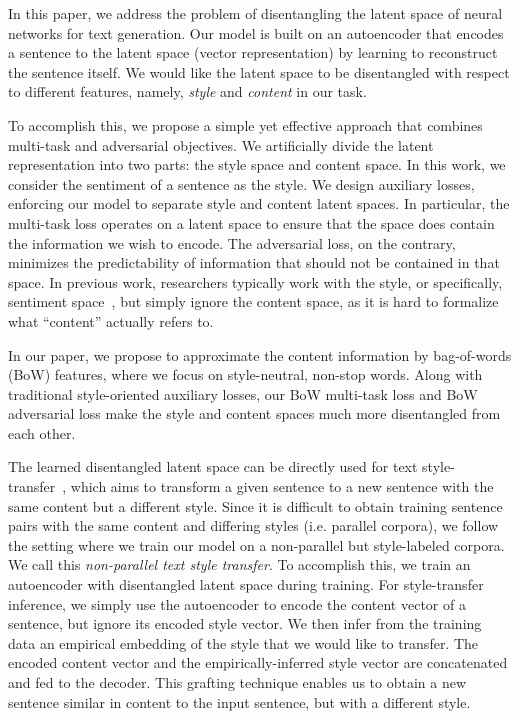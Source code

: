 \documentclass[letterpaper]{article} %
\begin{document}
In this paper, we address the problem of disentangling the latent space of neural networks for text generation.
Our model is built on an autoencoder that encodes a sentence to the latent space (vector representation) by learning to reconstruct the sentence itself.
We would like the latent space to be disentangled with respect to different features, namely, \textit{style} and \textit{content} in our task.

To accomplish this, we propose a simple yet effective approach that combines multi-task and adversarial objectives.
We artificially divide the latent representation into two parts: the style space and content space. In this work, we consider the sentiment of a sentence as the style.
We design auxiliary losses, enforcing our model to separate style and content latent spaces.
In particular, the multi-task loss operates on a latent space to ensure that the space does contain the information we wish to encode.
The adversarial loss, on the contrary, minimizes the predictability of information that should not be contained in that space.
In previous work, researchers typically work with the style, or specifically, sentiment space~\cite{hu2017toward,shen2017style,fu2018style}, but simply ignore the content space, as it is hard to formalize what ``content'' actually refers to.

In our paper, we propose to approximate the content information by bag-of-words (BoW) features, where we focus on style-neutral, non-stop words.
Along with traditional style-oriented auxiliary losses, our BoW multi-task loss and BoW adversarial loss make the style and content spaces much more disentangled from each other.

The learned disentangled latent space can be directly used for text style-transfer~\cite{hu2017toward,shen2017style}, which aims to transform a given sentence to a new sentence with the same content but a different style.
Since it is difficult to obtain training sentence pairs with the same content and differing styles (i.e. parallel corpora), we follow the setting where we train our model on a non-parallel but style-labeled corpora. We call this \textit{non-parallel text style transfer}.
To accomplish this, we train an autoencoder with disentangled latent space during training.
For style-transfer inference, we simply use the autoencoder to encode the content vector of a sentence, but ignore its encoded style vector.
We then infer from the training data an empirical embedding of the style that we would like to transfer.
The encoded content vector and the empirically-inferred style vector are concatenated and fed to the decoder.
This grafting technique enables us to obtain a new sentence similar in content to the input sentence, but with a different style.
\end{document}
